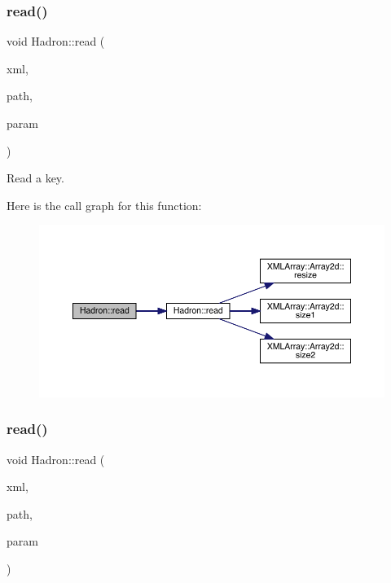 \subsubsection{\texorpdfstring{read()}{read()}\hspace{0.1cm}{\footnotesize\ttfamily [38/94]}}
{\footnotesize\ttfamily void Hadron\+::read (\begin{DoxyParamCaption}\item[{\mbox{\hyperlink{classADATXML_1_1XMLReader}{X\+M\+L\+Reader}} \&}]{xml,  }\item[{const std\+::string \&}]{path,  }\item[{\mbox{\hyperlink{structHadron_1_1KeyPropElementalOperator__t}{Key\+Prop\+Elemental\+Operator\+\_\+t}} \&}]{param }\end{DoxyParamCaption})}



Read a key. 

Here is the call graph for this function\+:
\nopagebreak
\begin{figure}[H]
\begin{center}
\leavevmode
\includegraphics[width=350pt]{d1/daf/namespaceHadron_a3b1642acb606c69519cf7dd88a01fbfd_cgraph}
\end{center}
\end{figure}
\mbox{\label{namespaceHadron_a9a69bb90cd1c62da66808573864f7cd1}} 
\subsubsection{\texorpdfstring{read()}{read()}\hspace{0.1cm}{\footnotesize\ttfamily [39/94]}}
{\footnotesize\ttfamily void Hadron\+::read (\begin{DoxyParamCaption}\item[{\mbox{\hyperlink{classADATXML_1_1XMLReader}{X\+M\+L\+Reader}} \&}]{xml,  }\item[{const std\+::string \&}]{path,  }\item[{\mbox{\hyperlink{structHadron_1_1HadronAdjMapTarget__t}{Hadron\+Adj\+Map\+Target\+\_\+t}} \&}]{param }\end{DoxyParamCaption})}

